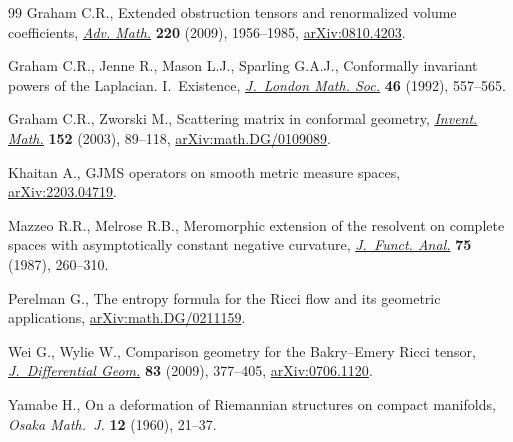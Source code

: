 \documentclass[pdftex]{sigma}
\numberwithin{equation}{section}
\begin{document}
\begin{thebibliography}{99}
Graham C.R., Extended obstruction tensors and renormalized volume coefficients,
 \href{https://doi.org/10.1016/j.aim.2008.11.015}{\textit{Adv. Math.}} \textbf{220} (2009), 1956--1985, \href{https://arxiv.org/abs/0810.4203}{arXiv:0810.4203}.

Graham C.R., Jenne R., Mason L.J., Sparling G.A.J., Conformally invariant
 powers of the {L}aplacian. {I}.~{E}xistence, \href{https://doi.org/10.1112/jlms/s2-46.3.557}{\textit{J.~London Math. Soc.}}
 \textbf{46} (1992), 557--565.

Graham C.R., Zworski M., Scattering matrix in conformal geometry,
 \href{https://doi.org/10.1007/s00222-002-0268-1}{\textit{Invent. Math.}} \textbf{152} (2003), 89--118,
 \href{https://arxiv.org/abs/math.DG/0109089}{arXiv:math.DG/0109089}.

Khaitan A., {GJMS} operators on smooth metric measure spaces,
 \href{https://arxiv.org/abs/2203.04719}{arXiv:2203.04719}.

Mazzeo R.R., Melrose R.B., Meromorphic extension of the resolvent on complete
 spaces with asymptotically constant negative curvature, \href{https://doi.org/10.1016/0022-1236(87)90097-8}{\textit{J.~Funct.
 Anal.}} \textbf{75} (1987), 260--310.

Perelman G., The entropy formula for the {R}icci flow and its geometric
 applications, \href{https://arxiv.org/abs/math.DG/0211159}{arXiv:math.DG/0211159}.

Wei G., Wylie W., Comparison geometry for the {B}akry--{E}mery {R}icci tensor,
 \href{https://doi.org/10.4310/jdg/1261495336}{\textit{J.~Differential Geom.}} \textbf{83} (2009), 377--405,
 \href{https://arxiv.org/abs/0706.1120}{arXiv:0706.1120}.

Yamabe H., On a deformation of {R}iemannian structures on compact manifolds,
 \textit{Osaka Math.~J.} \textbf{12} (1960), 21--37.

\end{thebibliography}\LastPageEnding
\end{document}
